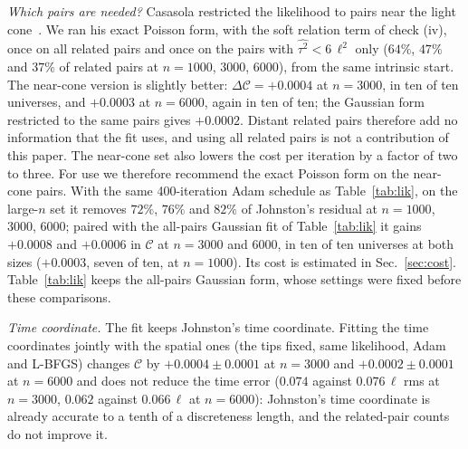 \documentclass[prd,twocolumn,superscriptaddress,nofootinbib,amsmath,amssymb,floatfix]{revtex4-2}
\begin{document}
\emph{Which pairs are needed?} Casasola restricted the likelihood to pairs near the light cone~\cite{Casasola26}. We ran his exact Poisson form, with the soft relation term of check (iv), once on all related pairs and once on the pairs with $\widehat{\tau^2}<6\,\ell^2$ only ($64\%$, $47\%$ and $37\%$ of related pairs at $n=1000$, $3000$, $6000$), from the same intrinsic start. The near-cone version is slightly better: $\Delta\mathcal C=+0.0004$ at $n=3000$, in ten of ten universes, and $+0.0003$ at $n=6000$, again in ten of ten; the Gaussian form restricted to the same pairs gives $+0.0002$. Distant related pairs therefore add no information that the fit uses, and using all related pairs is not a contribution of this paper. The near-cone set also lowers the cost per iteration by a factor of two to three. For use we therefore recommend the exact Poisson form on the near-cone pairs. With the same 400-iteration Adam schedule as Table~\ref{tab:lik}, on the large-$n$ set it removes $72\%$, $76\%$ and $82\%$ of Johnston's residual at $n=1000$, $3000$, $6000$; paired with the all-pairs Gaussian fit of Table~\ref{tab:lik} it gains $+0.0008$ and $+0.0006$ in $\mathcal C$ at $n=3000$ and $6000$, in ten of ten universes at both sizes ($+0.0003$, seven of ten, at $n=1000$). Its cost is estimated in Sec.~\ref{sec:cost}. Table~\ref{tab:lik} keeps the all-pairs Gaussian form, whose settings were fixed before these comparisons.

\emph{Time coordinate.} The fit keeps Johnston's time coordinate. Fitting the time coordinates jointly with the spatial ones (the tips fixed, same likelihood, Adam and L-BFGS) changes $\mathcal C$ by $+0.0004\pm0.0001$ at $n=3000$ and $+0.0002\pm0.0001$ at $n=6000$ and does not reduce the time error ($0.074$ against $0.076\,\ell$ rms at $n=3000$, $0.062$ against $0.066\,\ell$ at $n=6000$): Johnston's time coordinate is already accurate to a tenth of a discreteness length, and the related-pair counts do not improve it.
\end{document}
